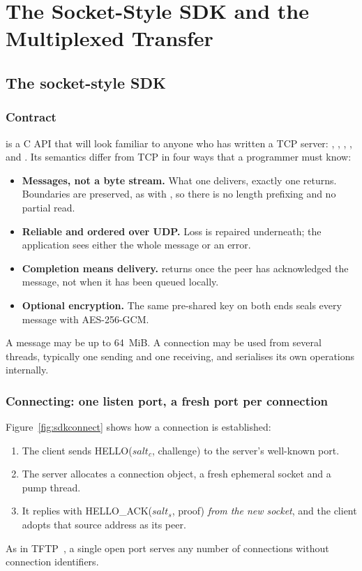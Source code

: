 \chapter{The Socket-Style SDK and the Multiplexed Transfer}\label{ch:sdkmux}

\section{The socket-style SDK}\label{sec:sdk}

\subsection{Contract}

 is a C API that will look familiar to anyone who has written a TCP server:
, , , ,  and
. Its semantics differ from TCP in four ways that a programmer must know:
\begin{itemize}
  \item \textbf{Messages, not a byte stream.} What one  delivers, exactly one 
    returns. Boundaries are preserved, as with , so there is no length prefixing and no
    partial read.
  \item \textbf{Reliable and ordered over UDP.} Loss is repaired underneath; the application sees either the
    whole message or an error.
  \item \textbf{Completion means delivery.}  returns once the peer has acknowledged the message,
    not when it has been queued locally.
  \item \textbf{Optional encryption.} The same pre-shared key on both ends seals every message with AES-256-GCM.
\end{itemize}
A message may be up to 64~MiB. A connection may be used from several threads, typically one sending and one
receiving, and serialises its own operations internally.

\subsection{Connecting: one listen port, a fresh port per connection}

Figure~\ref{fig:sdkconnect} shows how a connection is established:
\begin{enumerate}
  \item The client sends HELLO($\mathit{salt}_c$, challenge) to the server's well-known port.
  \item The server allocates a connection object, a fresh ephemeral socket and a pump thread.
  \item It replies with HELLO\_ACK($\mathit{salt}_s$, proof) \emph{from the new socket}, and the client adopts
    that source address as its peer.
\end{enumerate}
As in TFTP~\cite{rfc1350}, a single open port serves any number of connections without connection identifiers.

